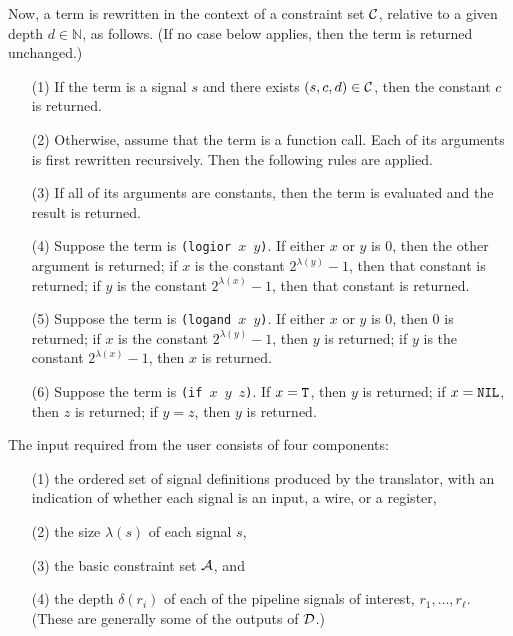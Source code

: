 \documentclass{article}
\begin{document}
Now, a term is rewritten in the context of a constraint set ${\cal
C}$, relative to a given depth $d \in {\mathbb N}$, as follows.  (If
no case below applies, then the term is returned
unchanged.)\label{prewrite}
\begin{enumerate}

\item[(1)] If the term is a signal $s$ and there exists $(s,c,d)
\in {\cal C}$, then the constant $c$ is returned.

\item[(2)] Otherwise, assume that the term is a function call.  Each of
its arguments is first rewritten recursively.  Then the following rules are
applied.

\item[(3)] If all of its arguments are constants, then the term is
evaluated and the result is returned.

\item[(4)] Suppose the term is {\tt (logior $x$ $y$)}.  If either $x$
or $y$ is 0, then the other argument is returned; if $x$ is the
constant $2^{\lambda(y)}-1$, then that constant is returned; if $y$ is the
constant $2^{\lambda(x)}-1$, then that constant is returned.

\item[(5)] Suppose the term is {\tt (logand $x$ $y$)}.  If either $x$
or $y$ is 0, then 0 is returned; if $x$ is the constant
$2^{\lambda(y)}-1$, then $y$ is returned; if $y$ is the constant
$2^{\lambda(x)}-1$, then $x$ is returned.

\item[(6)] Suppose the term is {\tt (if $x$ $y$ $z$)}.  If $x = {\tt
T}$, then $y$ is returned; if $x = {\tt NIL}$, then $z$ is returned;
if $y = z$, then $y$ is returned.

\end{enumerate}

The input required from the user consists of four components:

\begin{enumerate}

\item[(1)] the ordered set of signal definitions produced by the
translator, with an indication of whether each signal is an input, a
wire, or a register,

\item[(2)] the size $\lambda(s)$ of each signal $s$, 

\item[(3)] the basic constraint set ${\cal A}$, and 

\item[(4)] the depth $\delta(r_i)$ of each of the pipeline signals of
interest, $r_1,\ldots,r_\ell$.  (These are generally some of the
outputs of ${\cal D}$.)

\end{enumerate}
\end{document}
